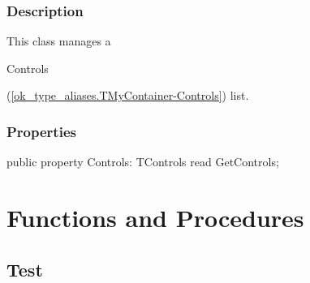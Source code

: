 \documentclass{report}
\newif\ifpdf
\begin{document}
\subsubsection*{\large{\textbf{Description}}\normalsize\hspace{1ex}\hfill}
This class manages a \begin{ttfamily}Controls\end{ttfamily}(\ref{ok_type_aliases.TMyContainer-Controls}) list.\subsubsection*{\large{\textbf{Properties}}\normalsize\hspace{1ex}\hfill}
\begin{list}{}{
\setlength{\itemindent}{0cm}
\setlength{\listparindent}{0cm}
\setlength{\leftmargin}{\evensidemargin}
\addtolength{\leftmargin}{\tmplength}
\settowidth{\labelsep}{X}
\addtolength{\leftmargin}{\labelsep}
\setlength{\labelwidth}{\tmplength}
}
\label{ok_type_aliases.TMyContainer-Controls}
\item[\textbf{Controls}\hfill]
\ifpdf
\begin{flushleft}
\fi
\begin{ttfamily}
public property Controls: TControls read GetControls;\end{ttfamily}

\ifpdf
\end{flushleft}
\fi


\par  \end{list}
\section{Functions and Procedures}
\ifpdf
\subsection*{\large{\textbf{Test}}\normalsize\hspace{1ex}\hrulefill}
\else
\end{document}
